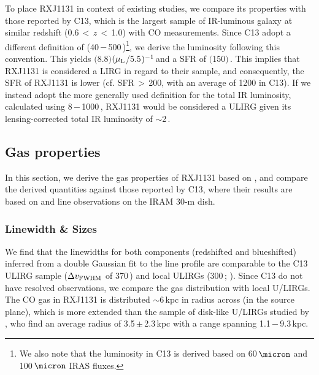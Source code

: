 \documentclass[]{emulateapj}
\begin{document}
To place RXJ1131 in context of existing studies,
we compare its properties
with those reported by C13, which is the largest sample of
IR-luminous galaxy at similar redshift
(0.6\,$<$\,$z$\,$<$\,1.0) with CO measurements.
Since C13 adopt a different definition of
\LFIR (40\,$-$\,500\,\micron)\footnote{We also note that the
\fir luminosity in C13 is derived based on 60\,$\micron$ and 100\,$\micron$ IRAS fluxes.},
we derive the \fir luminosity following this convention.
This yields $($8.8$)$$(\mu_{\rm L}$/5.5$)\mbox{$^{-1}$}$\,\Lsun and
a SFR of $($150$)$\,\sfrU.
This implies that RXJ1131 is considered a LIRG in regard to their
sample, and consequently, the SFR of RXJ1131 is lower
(cf. SFR\,$>$\,200, with an average of 1200 in C13).
If we instead adopt the
more generally used definition for the total IR luminosity,
calculated using 8\,$-$\,1000\,\micron, RXJ1131 would be
considered a ULIRG given its lensing-corrected
total IR luminosity of $\sim$2\,\Lsun.

\subsection{Gas properties} \label{sec:properties}
In this section, we derive the gas properties of RXJ1131 based on \bco,
and compare the derived quantities against those reported by
C13, where their results are based on \bco and  line observations on the IRAM 30-m dish.

\subsubsection{Linewidth \& Sizes} %
We find that the linewidths for both components (redshifted and blueshifted)
inferred from a double Gaussian fit to the line profile are
comparable to the C13 ULIRG sample
($\Delta v_{\rm FWHM}$ of 370\,\kms) and local ULIRGs
(300\,\kms; \citealt[][]{Solomon97a}).
Since C13 do not have resolved observations, we compare the
gas distribution with local U/LIRGs. The CO gas in RXJ1131 is
distributed $\sim$6\,kpc in radius across (in
the source plane), which is more extended than the
sample of disk-like U/LIRGs studied by
\citet[hereafter U14]{Ueda14a}, %
who find an average radius of 3.5\,$\pm$\,2.3\,kpc
with a range spanning 1.1\,$-$\,9.3\,kpc.
\end{document}
